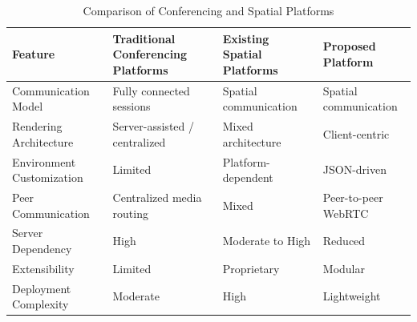 \documentclass[12pt]{article}
\begin{document}
\begin{table}[h!]
\centering
\renewcommand{\arraystretch}{1.5}

\begin{tabularx}{\textwidth}{|X|X|X|X|}
\hline
\textbf{Feature} & \textbf{Traditional Conferencing Platforms} & \textbf{Existing Spatial Platforms} & \textbf{Proposed Platform} \\ 
\hline

Communication Model & Fully connected sessions & Spatial communication & Spatial communication \\ 
\hline

Rendering Architecture & Server-assisted / centralized & Mixed architecture & Client-centric \\ 
\hline

Environment Customization & Limited & Platform-dependent & JSON-driven \\ 
\hline

Peer Communication & Centralized media routing & Mixed & Peer-to-peer WebRTC \\ 
\hline

Server Dependency & High & Moderate to High & Reduced \\ 
\hline

Extensibility & Limited & Proprietary & Modular \\ 
\hline

Deployment Complexity & Moderate & High & Lightweight \\ 
\hline

\end{tabularx}
\caption{Comparison of Conferencing and Spatial Platforms}

\end{table}
\end{document}
